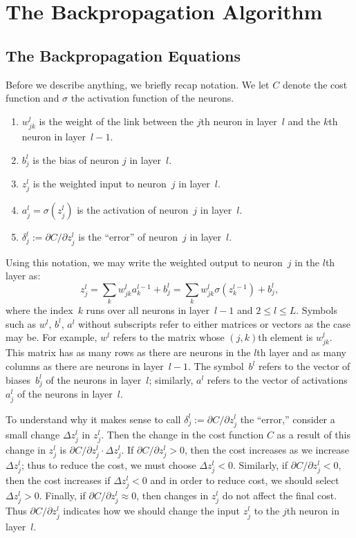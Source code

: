 \chapter{The Backpropagation Algorithm}

\section{The Backpropagation Equations}

Before we describe anything, we briefly recap notation. We let
$C$ denote the cost function and $\sigma$ the activation function
of the neurons.
\begin{enumerate}
    \item $w_{j k}^{l}$ is the weight of the link between the $j$th
        neuron in layer~$l$ and the $k$th neuron in layer~$l - 1$.
    \item $b_j^l$ is the bias of neuron $j$ in layer~$l$.
    \item $z_{j}^l$ is the weighted input to neuron~$j$ in layer~$l$.
    \item $a_j^{l} = \sigma(z_{j}^l)$ is the activation of neuron~$j$ in
        layer~$l$.
    \item $\delta_{j}^{l} := \partial C / \partial z_{j}^{l}$ is
        the ``error'' of neuron~$j$ in layer~$l$.
\end{enumerate}

Using this notation, we may write the weighted output to neuron~$j$
in the $l$th layer as:
\[
    z_{j}^{l} = \sum_{k} w_{j k}^l a_{k}^{l - 1} + b_{j}^l =
                \sum_{k} w_{j k}^l \sigma (z_{k}^{l - 1}) + b_{j}^l,
\]
where the index~$k$ runs over all neurons in layer~$l - 1$ and
$2 \leq l \leq L$. Symbols such as $w^{l}$, $b^{l}$, $a^{l}$ without
subscripts refer to either matrices or vectors as the case may be.
For example, $w^{l}$ refers to the matrix whose $(j, k)$th element
is $w_{j k}^{l}$. This matrix has as many rows as there are neurons
in the $l$th layer and as many columns as there are neurons in
layer~$l - 1$. The symbol~$b^{l}$ refers to the vector of
biases~$b_{j}^l$ of the neurons in layer~$l$; similarly, $a^{l}$
refers to the vector of activations~$a_{j}^l$ of the neurons in
layer~$l$.

To understand why it makes sense to call
$\delta_{j}^{l} := \partial C / \partial z_{j}^{l}$  the ``error,'' consider a
small change $\Delta z_j^l$ in $z_j^l$. Then the change in the cost function $C$
as a result of this change in $z_j^l$ is $\partial C / \partial z_j^l \cdot \Delta z_j^l$.
If $\partial C / \partial z_{j}^{l} > 0$, then the cost increases as we increase
$\Delta z_j^l$; thus to reduce the cost, we must choose $\Delta z_j^l < 0$. Similarly,
if $\partial C / \partial z_{j}^{l} < 0$, then the cost increases if $\Delta z_j^l < 0$
and in order to reduce cost, we should select $\Delta z_j^l > 0$. Finally, if
$\partial C / \partial z_{j}^{l} \approx 0$, then changes in $z_j^l$ do not
affect the final cost. Thus $\partial C / \partial z_{j}^{l}$ indicates how we
should change the input $z_j^l$ to the $j$th neuron in layer~$l$.

